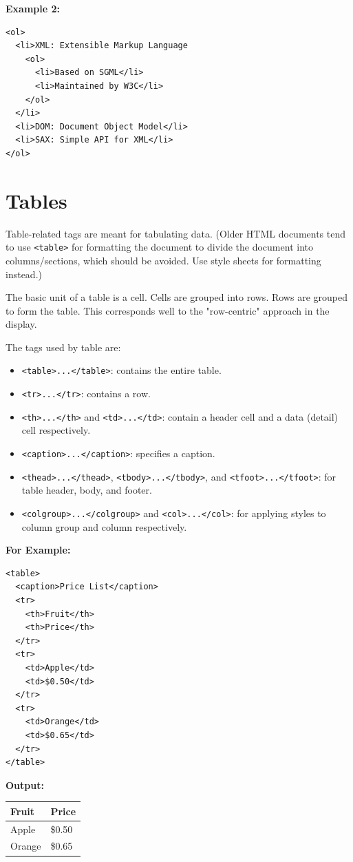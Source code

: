 \documentclass[12pt,a4paper]{article}
\begin{document}
\textbf{Example 2:}
\begin{verbatim}
<ol>
  <li>XML: Extensible Markup Language
    <ol>
      <li>Based on SGML</li>
      <li>Maintained by W3C</li>
    </ol>
  </li>
  <li>DOM: Document Object Model</li>
  <li>SAX: Simple API for XML</li>
</ol>
\end{verbatim}

\section*{Tables}
Table-related tags are meant for tabulating data. (Older HTML documents tend to use \texttt{<table>} for formatting the document to divide the document into columns/sections, which should be avoided. Use style sheets for formatting instead.)

The basic unit of a table is a cell. Cells are grouped into rows. Rows are grouped to form the table. This corresponds well to the "row-centric" approach in the display.

The tags used by table are:
\begin{itemize}
    \item \texttt{<table>...</table>}: contains the entire table.
    \item \texttt{<tr>...</tr>}: contains a row.
    \item \texttt{<th>...</th>} and \texttt{<td>...</td>}: contain a header cell and a data (detail) cell respectively.
    \item \texttt{<caption>...</caption>}: specifies a caption.
    \item \texttt{<thead>...</thead>}, \texttt{<tbody>...</tbody>}, and \texttt{<tfoot>...</tfoot>}: for table header, body, and footer.
    \item \texttt{<colgroup>...</colgroup>} and \texttt{<col>...</col>}: for applying styles to column group and column respectively.
\end{itemize}

\textbf{For Example:}
\begin{verbatim}
<table>
  <caption>Price List</caption>
  <tr>
    <th>Fruit</th>
    <th>Price</th>
  </tr>
  <tr>
    <td>Apple</td>
    <td>$0.50</td>
  </tr>
  <tr>
    <td>Orange</td>
    <td>$0.65</td>
  </tr>
</table>
\end{verbatim}

\textbf{Output:}
\begin{center}
\begin{tabular}{|l|l|}
\hline
\textbf{Fruit} & \textbf{Price} \\ \hline
Apple & \$0.50 \\ \hline
Orange & \$0.65 \\ \hline
\end{tabular}
\end{center}
\end{document}
